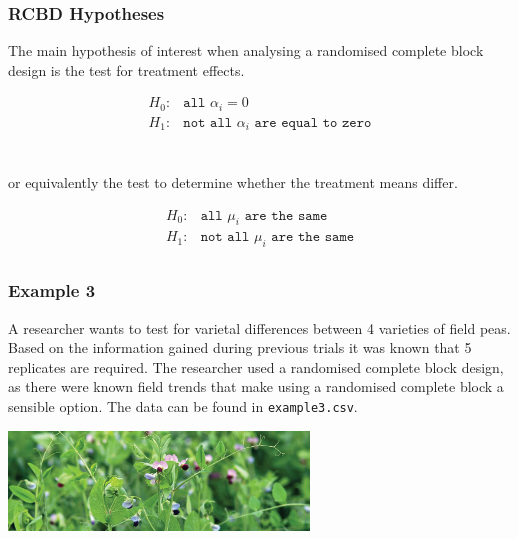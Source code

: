 \begin{frame}\frametitle{RCBD Hypotheses}
The main hypothesis of interest when analysing a randomised complete block design is the test for treatment effects.

\begin{eqnarray*}
H_0:& \texttt{all } \alpha_i = 0 \\
H_1:& \texttt{not all } \alpha_i \texttt{ are equal to zero} \\
\end{eqnarray*}\

or equivalently the test to determine whether the treatment means differ.

\begin{eqnarray*}
H_0:& \texttt{all } \mu_i \texttt{ are the same} \\
H_1:& \texttt{not all } \mu_i \texttt{ are the same} \\
\end{eqnarray*}
\end{frame}





\begin{frame}\frametitle{Example 3}

A researcher wants to test for varietal differences between 4 varieties of field peas. Based on the information gained
during previous trials it was known that 5 replicates are required. The researcher used a randomised complete block
design, as there were known field trends that make using a randomised complete block a sensible option. The data can be
found in  \texttt{example3.csv}.

\vspace{1cm}
\centering
\includegraphics[width = 8cm]{fpeas}

\end{frame}


